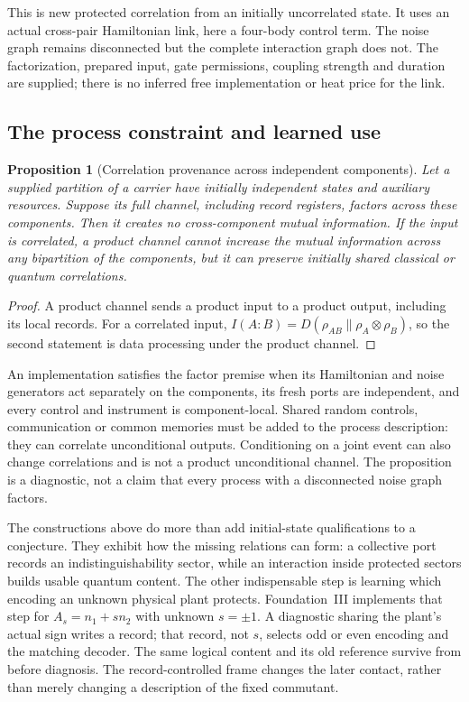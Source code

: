 \documentclass[12pt,a4paper]{article}
\newtheorem{proposition}[theorem]{Proposition}
\begin{document}
This is new protected correlation from an initially uncorrelated
state. It uses an actual cross-pair Hamiltonian link, here a four-body
control term. The noise graph remains disconnected but the complete
interaction graph does not. The factorization, prepared input, gate
permissions, coupling strength and duration are supplied; there is
no inferred free implementation or heat price for the link.

\subsection{The process constraint and learned use}

\begin{proposition}[Correlation provenance across independent components]
\label{prop:provenance}
Let a supplied partition of a carrier have initially independent
states and auxiliary resources. Suppose its full channel, including
record registers, factors across these components. Then it creates
no cross-component mutual information. If the input is correlated,
a product channel cannot increase the mutual information across any
bipartition of the components, but it can preserve initially shared
classical or quantum correlations.
\end{proposition}
\begin{proof}
A product channel sends a product input to a product output, including
its local records. For a correlated input,
$I(A:B)=D(\rho_{AB}\|\rho_A\otimes\rho_B)$, so the second statement
is data processing under the product channel.
\end{proof}

An implementation satisfies the factor premise when its Hamiltonian
and noise generators act separately on the components, its fresh
ports are independent, and every control and instrument is
component-local. Shared random controls, communication or common
memories must be added to the process description: they can correlate
unconditional outputs. Conditioning on a joint event can also change
correlations and is not a product unconditional channel. The
proposition is a diagnostic, not a claim that every process with a
disconnected noise graph factors.

The constructions above do more than add initial-state qualifications
to a conjecture. They exhibit how the missing relations can form:
a collective port records an indistinguishability sector, while an
interaction inside protected sectors builds usable quantum content.
The other indispensable step is learning which encoding an unknown
physical plant protects. Foundation~III \cite{PaperFIII} implements
that step for $A_s=n_1+s n_2$ with unknown $s=\pm1$. A diagnostic
sharing the plant's actual sign writes a record; that record, not
$s$, selects odd or even encoding and the matching decoder. The same
logical content and its old reference survive from before diagnosis.
The record-controlled frame changes the later contact, rather than
merely changing a description of the fixed commutant.
\end{document}
